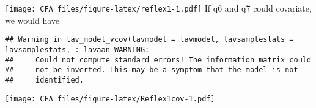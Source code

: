\documentclass[
]{article}
\newenvironment{Shaded}{\begin{snugshade}}{\end{snugshade}}
\newcommand{\AttributeTok}[1]{\textcolor[rgb]{0.77,0.63,0.00}{#1}}
\newcommand{\ConstantTok}[1]{\textcolor[rgb]{0.00,0.00,0.00}{#1}}
\newcommand{\FloatTok}[1]{\textcolor[rgb]{0.00,0.00,0.81}{#1}}
\newcommand{\FunctionTok}[1]{\textcolor[rgb]{0.00,0.00,0.00}{#1}}
\newcommand{\NormalTok}[1]{#1}
\newcommand{\OtherTok}[1]{\textcolor[rgb]{0.56,0.35,0.01}{#1}}
\newcommand{\SpecialCharTok}[1]{\textcolor[rgb]{0.00,0.00,0.00}{#1}}
\newcommand{\StringTok}[1]{\textcolor[rgb]{0.31,0.60,0.02}{#1}}
\begin{document}
\texttt{[image: CFA\_files/figure-latex/reflex1-1.pdf]} If q6 and q7
could covariate, we would have

\begin{Shaded}
\end{Shaded}

\begin{verbatim}
## Warning in lav_model_vcov(lavmodel = lavmodel, lavsamplestats = lavsamplestats, : lavaan WARNING:
##     Could not compute standard errors! The information matrix could
##     not be inverted. This may be a symptom that the model is not
##     identified.
\end{verbatim}

\begin{Shaded}
\end{Shaded}

\texttt{[image: CFA\_files/figure-latex/Reflex1cov-1.pdf]}
\end{document}
